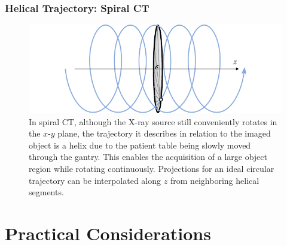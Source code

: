 \begin{frame}
	\frametitle{Helical Trajectory: Spiral CT}

	\begin{figure}[tbp]
		\centering
		\includegraphics[width=\linewidth]{images/geom_3}
		\caption{In spiral CT, although the X-ray source still conveniently rotates in the $x$-$y$ plane, the trajectory it describes in relation to the imaged object is a helix due to the patient table being slowly moved through the gantry. This enables the acquisition of a large object region while rotating continuously. Projections for an ideal circular trajectory can be interpolated along $z$ from neighboring helical segments.}
		\label{fig:ct_geom_1.3}
	\end{figure}

\end{frame}

\subtitle{Computed Tomography - Part 3}
\frame[plain,c]{\titlepage}

\section{Practical Considerations}
\label{sec:ct_considerations}

%

